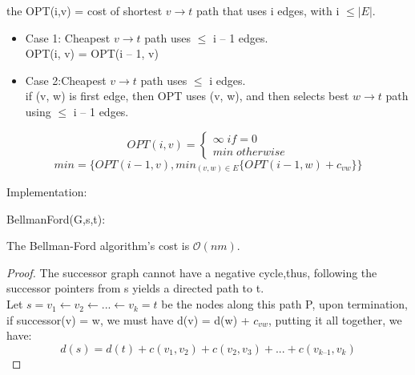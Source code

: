 the OPT(i,v) = cost of shortest $v\rightarrow t$ path that uses i edges, with i $\leq |E|$.

\begin{itemize}

    \item {Case 1: Cheapest  $v\rightarrow t$ path uses $\leq$ i – 1 edges.}\\
          OPT(i, v) = OPT(i – 1, v)

    \item {Case 2:Cheapest  $v\rightarrow t$ path uses $\leq$ i edges.}\\
          if (v, w) is first edge, then OPT uses (v, w), and then selects best $w \rightarrow t$ path using $\leq$ i – 1 edges.


\end{itemize}

\[OPT(i,v) = \begin{cases} \infty \; if = 0  \\ min \; otherwise \end{cases}\]
\[min= \{ OPT(i-1,v),min_{(v,w) \in E} \{OPT(i−1, w)+c_{vw} \}\} \]

Implementation:

\begin{algorithm}[H]
    \SetAlgoLined
    \small

    \BlankLine


    \BlankLine

    \caption{BellmanFord(G,s,t):}
\end{algorithm}

\begin{claim}
    The Bellman-Ford algorithm's cost is $\mathcal{O}{(nm)}$.
\end{claim}
\begin{proof}
    The successor graph cannot have a negative cycle,thus, following the successor pointers from s yields a directed path to t.\\
    Let $s = v_{1} \leftarrow v_{2} \leftarrow ... \leftarrow v_{k} = t$ be the nodes along this path P, upon termination, if successor(v) = w, we must have d(v) = d(w) + $c_{vw}$, putting it all together, we have:
    \[d(s) = d(t) + c(v_{1}, v_{2}) + c(v_{2}, v_{3}) + ... + c(v_{k–1}, v_{k})\]
\end{proof}


\clearpage

